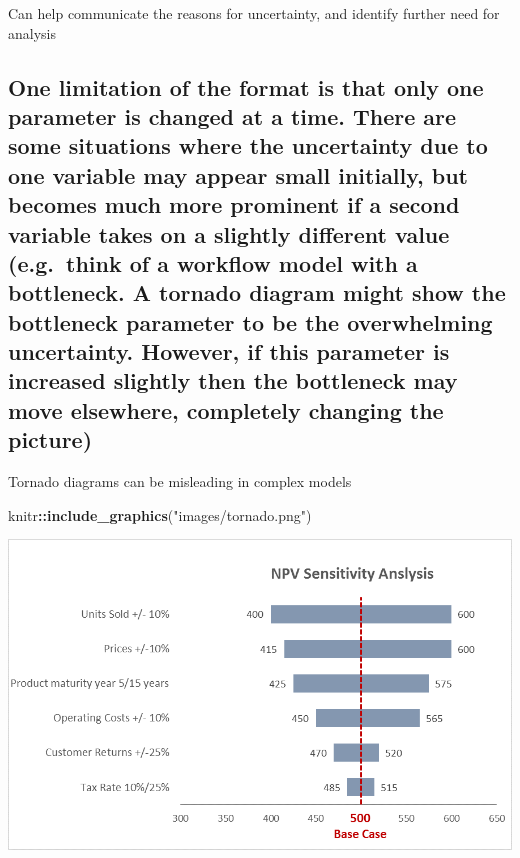 \documentclass[]{book}
\newenvironment{Shaded}{\begin{snugshade}}{\end{snugshade}}
\newcommand{\KeywordTok}[1]{\textcolor[rgb]{0.13,0.29,0.53}{\textbf{#1}}}
\newcommand{\StringTok}[1]{\textcolor[rgb]{0.31,0.60,0.02}{#1}}
\newcommand{\OperatorTok}[1]{\textcolor[rgb]{0.81,0.36,0.00}{\textbf{#1}}}
\newcommand{\NormalTok}[1]{#1}
\begin{document}
 Can help communicate the reasons for uncertainty, and identify further
need for analysis

\subsection{One limitation of the format is that only one parameter is
changed at a time. There are some situations where the uncertainty due
to one variable may appear small initially, but becomes much more
prominent if a second variable takes on a slightly different value
(e.g.~think of a workflow model with a bottleneck. A tornado diagram
might show the bottleneck parameter to be the overwhelming uncertainty.
However, if this parameter is increased slightly then the bottleneck may
move elsewhere, completely changing the
picture)}\label{one-limitation-of-the-format-is-that-only-one-parameter-is-changed-at-a-time.-there-are-some-situations-where-the-uncertainty-due-to-one-variable-may-appear-small-initially-but-becomes-much-more-prominent-if-a-second-variable-takes-on-a-slightly-different-value-e.g.think-of-a-workflow-model-with-a-bottleneck.-a-tornado-diagram-might-show-the-bottleneck-parameter-to-be-the-overwhelming-uncertainty.-however-if-this-parameter-is-increased-slightly-then-the-bottleneck-may-move-elsewhere-completely-changing-the-picture}

 Tornado diagrams can be misleading in complex models

\begin{Shaded}
\begin{Highlighting}[]
\NormalTok{knitr}\OperatorTok{::}\KeywordTok{include_graphics}\NormalTok{(}\StringTok{"images/tornado.png"}\NormalTok{)}
\end{Highlighting}
\end{Shaded}

\begin{center}\includegraphics{images/tornado} \end{center}
\end{document}

